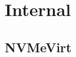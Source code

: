\section{Internal}\label{s:internal}

\subsection{NVMeVirt}

\begin{comment}
NVMeVirt\cite{nvmevirt} is a Linux kernel module that provides a virtual NVMe device to the system, supporting various types of SSDs including basic SSDs, ZNS SSDs, and key-value SSDs.
The device is emulated at the PCI layer and can be used not only for standard devices but also for advanced storage configurations such as NVMe-over-Fabrics offloads.

The storage space of modern SSDs is divided into multiple partitions, as shown in Figure \ref{fig:structure}, with each partition managed by a separate FTL instance.
As a result, multiple FTL instances exist within a single SSD, sharing one PCIe link connected to the host.
Each partition consists of several NAND channels, and each channel is connected to multiple dies.
This architecture allows for data transfer through NAND channels to be serialized, while each die can operate independently.
In this structure, the FTL coordinates the dies and channels to handle I/O requests.
Thanks to this design, a single I/O request can be split into smaller tasks and distributed across multiple FTL instances, allowing for parallel processing.

As the data density per cell increases, the NAND programming time has also increased.
To hide this time, a write buffer is employed.
The data from incoming write requests is stored in the write buffer, and the write request is considered complete when the payload is copied to the write buffer.
If this write buffer becomes full, the data must be processed.
However, in NVMeVirt, to facilitate one-shot programming, this data is not immediately processed.
Instead, it waits until the buffering of another logical page in the same physical page is completed, after which the data is moved to the corresponding FTL for storage.
Once the write operation is complete, the FTL instance is reclaimed.
This processing occurs in the background.
For reads, the data is sent directly from the FTL instance to the buffer specified in the NVMe command without passing through the write buffer.


\end{comment}
